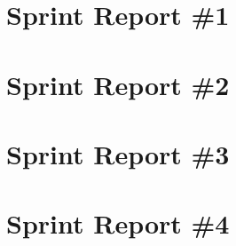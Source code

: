 
\section{Sprint Report \#1}


\section{Sprint Report \#2}


\section{Sprint Report \#3}


\section{Sprint Report \#4}

